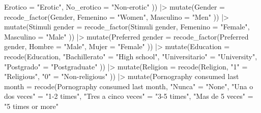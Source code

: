 \documentclass[
  bookmarksnumbered]{article}
\newenvironment{Shaded}{\begin{snugshade}}{\end{snugshade}}
\newcommand{\AttributeTok}[1]{\textcolor[rgb]{0.80,0.80,0.80}{#1}}
\newcommand{\FunctionTok}[1]{\textcolor[rgb]{0.94,0.94,0.56}{#1}}
\newcommand{\NormalTok}[1]{\textcolor[rgb]{0.80,0.80,0.80}{#1}}
\newcommand{\OtherTok}[1]{\textcolor[rgb]{0.94,0.94,0.56}{#1}}
\newcommand{\SpecialCharTok}[1]{\textcolor[rgb]{0.86,0.64,0.64}{#1}}
\newcommand{\StringTok}[1]{\textcolor[rgb]{0.80,0.58,0.58}{#1}}
\begin{document}
\begin{Shaded}
\begin{Highlighting}[]
    \AttributeTok{Erotico =} \StringTok{"Erotic"}\NormalTok{,}
    \AttributeTok{No\_erotico =} \StringTok{"Non{-}erotic"}
\NormalTok{  )) }\SpecialCharTok{|\textgreater{}}
  \FunctionTok{mutate}\NormalTok{(}\AttributeTok{Gender =} \FunctionTok{recode\_factor}\NormalTok{(Gender,}
    \AttributeTok{Femenino =} \StringTok{"Women"}\NormalTok{,}
    \AttributeTok{Masculino =} \StringTok{"Men"}
\NormalTok{  )) }\SpecialCharTok{|\textgreater{}}
  \FunctionTok{mutate}\NormalTok{(}\StringTok{\textasciigrave{}}\AttributeTok{Stimuli gender}\StringTok{\textasciigrave{}} \OtherTok{=} \FunctionTok{recode\_factor}\NormalTok{(}\StringTok{\textasciigrave{}}\AttributeTok{Stimuli gender}\StringTok{\textasciigrave{}}\NormalTok{,}
    \AttributeTok{Femenino =} \StringTok{"Female"}\NormalTok{,}
    \AttributeTok{Masculino =} \StringTok{"Male"}
\NormalTok{  )) }\SpecialCharTok{|\textgreater{}}
  \FunctionTok{mutate}\NormalTok{(}\StringTok{\textasciigrave{}}\AttributeTok{Preferred gender}\StringTok{\textasciigrave{}} \OtherTok{=} \FunctionTok{recode\_factor}\NormalTok{(}\StringTok{\textasciigrave{}}\AttributeTok{Preferred gender}\StringTok{\textasciigrave{}}\NormalTok{,}
    \AttributeTok{Hombre =} \StringTok{"Male"}\NormalTok{,}
    \AttributeTok{Mujer =} \StringTok{"Female"}
\NormalTok{  )) }\SpecialCharTok{|\textgreater{}}
  \FunctionTok{mutate}\NormalTok{(}\AttributeTok{Education =} \FunctionTok{recode}\NormalTok{(Education,}
    \StringTok{"Bachillerato"} \OtherTok{=} \StringTok{"High school"}\NormalTok{,}
    \StringTok{"Universitario"} \OtherTok{=} \StringTok{"University"}\NormalTok{,}
    \StringTok{"Postgrado"} \OtherTok{=} \StringTok{"Postgraduate"}
\NormalTok{  )) }\SpecialCharTok{|\textgreater{}}
  \FunctionTok{mutate}\NormalTok{(}\AttributeTok{Religion =} \FunctionTok{recode}\NormalTok{(Religion,}
    \StringTok{"1"} \OtherTok{=} \StringTok{"Religious"}\NormalTok{,}
    \StringTok{"0"} \OtherTok{=} \StringTok{"Non{-}religious"}
\NormalTok{  )) }\SpecialCharTok{|\textgreater{}}
  \FunctionTok{mutate}\NormalTok{(}\StringTok{\textasciigrave{}}\AttributeTok{Pornography consumed last month}\StringTok{\textasciigrave{}} \OtherTok{=} \FunctionTok{recode}\NormalTok{(}\StringTok{\textasciigrave{}}\AttributeTok{Pornography consumed last month}\StringTok{\textasciigrave{}}\NormalTok{,}
    \StringTok{"Nunca"} \OtherTok{=} \StringTok{"None"}\NormalTok{,}
    \StringTok{"Una o dos veces"} \OtherTok{=} \StringTok{"1{-}2 times"}\NormalTok{,}
    \StringTok{"Tres a cinco veces"} \OtherTok{=} \StringTok{"3{-}5 times"}\NormalTok{,}
    \StringTok{"Mas de 5 veces"} \OtherTok{=} \StringTok{"5 times or more"}

\end{Highlighting}
\end{Shaded}
\end{document}
